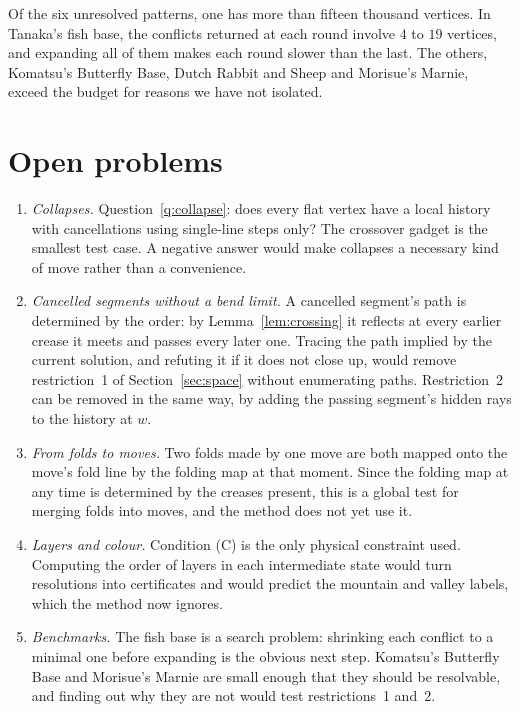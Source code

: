 \documentclass[11pt]{article}
\theoremstyle{definition}
\theoremstyle{remark}
\begin{document}
Of the six unresolved patterns, one has more than fifteen thousand vertices. In Tanaka's fish base, the conflicts returned at each round involve $4$ to $19$ vertices, and expanding all of them makes each round slower than the last. The others, Komatsu's Butterfly Base, Dutch Rabbit and Sheep and Morisue's Marnie, exceed the budget for reasons we have not isolated.

\section{Open problems}\label{sec:open}

\begin{enumerate}
\item \emph{Collapses.} Question~\ref{q:collapse}: does every flat vertex have a local history with cancellations using single-line steps only? The crossover gadget is the smallest test case. A negative answer would make collapses a necessary kind of move rather than a convenience.
\item \emph{Cancelled segments without a bend limit.} A cancelled segment's path is determined by the order: by Lemma~\ref{lem:crossing} it reflects at every earlier crease it meets and passes every later one. Tracing the path implied by the current solution, and refuting it if it does not close up, would remove restriction~1 of Section~\ref{sec:space} without enumerating paths. Restriction~2 can be removed in the same way, by adding the passing segment's hidden rays to the history at $w$.
\item \emph{From folds to moves.} Two folds made by one move are both mapped onto the move's fold line by the folding map at that moment. Since the folding map at any time is determined by the creases present, this is a global test for merging folds into moves, and the method does not yet use it.
\item \emph{Layers and colour.} Condition (C) is the only physical constraint used. Computing the order of layers in each intermediate state would turn resolutions into certificates and would predict the mountain and valley labels, which the method now ignores.
\item \emph{Benchmarks.} The fish base is a search problem: shrinking each conflict to a minimal one before expanding is the obvious next step. Komatsu's Butterfly Base and Morisue's Marnie are small enough that they should be resolvable, and finding out why they are not would test restrictions~1 and~2.
\end{enumerate}
\end{document}
